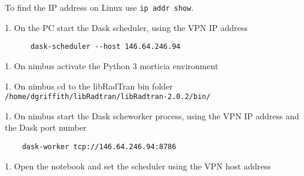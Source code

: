     To find the IP address on Linux use \lstinline{ip addr show}.


1. On the PC start the Dask scheduler, using the VPN IP address


\begin{lstlisting}
      dask-scheduler --host 146.64.246.94
\end{lstlisting}

1. On nimbus activate the Python 3 morticia environment 

1. On nimbus cd to the libRadTran bin folder  \lstinline{/home/dgriffith/libRadtran/libRadtran-2.0.2/bin/}

1. On nimbus start the Dask scheworker process, using the VPN IP address and the Dask port number

\begin{lstlisting}
    dask-worker tcp://146.64.246.94:8786
\end{lstlisting}

1. Open the notebook and set the scheduler using the VPN host address



